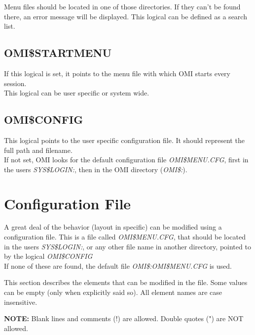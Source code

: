 \documentclass[a4paper]{book}
\newcommand{\vs}{\vspace{3mm}}
\begin{document}
\vs

Menu files should be located in one of those directories. If they can't be 
found there, an error message will be displayed. This logical can be defined 
as a search list.

\subsection{OMI{\$}STARTMENU}
\label{subsubsec:mylabel14}

If this logical is set, it points to the menu file with which OMI starts 
every session. \\
This logical can be user specific or system wide.

\subsection{OMI{\$}CONFIG}
\label{subsubsec:mylabel15}

This logical points to the user specific configuration file. It should 
represent the full path and filename. \\
If not set, OMI looks for the default configuration file \textsl{OMI{\$}MENU.CFG}, 
first in the users \textsl{SYS{\$}LOGIN:}, then in the OMI directory (\textsl{OMI{\$}:}).

\section{Configuration File}
\label{subsec:configuration}

A great deal of the behavior (layout in specific) can be modified using a 
configuration file. This is a file called \textsl{OMI{\$}MENU.CFG}, that should be 
located in the users \textsl{SYS{\$}LOGIN:}, or any other file name in another 
directory, pointed to by the logical \textsl{OMI{\$}CONFIG} \\
If none of these are found, the default file \textsl{OMI{\$}:OMI{\$}MENU.CFG} is 
used.

\vs

This section describes the elements that can be modified in the file. Some 
values can be empty (only when explicitly said so). All element names are 
case insensitive.

\vs

\hspace{-8mm}\textbf{NOTE:} Blank lines and comments (!) are allowed. Double quotes (") 
are NOT allowed.
\end{document}
